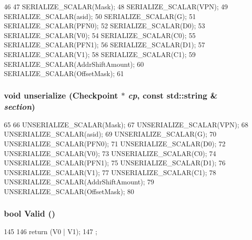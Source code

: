 \begin{DoxyCode}
46 {
47     SERIALIZE_SCALAR(Mask);
48     SERIALIZE_SCALAR(VPN);
49     SERIALIZE_SCALAR(asid);
50     SERIALIZE_SCALAR(G);
51     SERIALIZE_SCALAR(PFN0);
52     SERIALIZE_SCALAR(D0);
53     SERIALIZE_SCALAR(V0);
54     SERIALIZE_SCALAR(C0);
55     SERIALIZE_SCALAR(PFN1);
56     SERIALIZE_SCALAR(D1);
57     SERIALIZE_SCALAR(V1);
58     SERIALIZE_SCALAR(C1);
59     SERIALIZE_SCALAR(AddrShiftAmount);
60     SERIALIZE_SCALAR(OffsetMask);
61 }
\end{DoxyCode}
\hypertarget{structPowerISA_1_1PTE_af22e5d6d660b97db37003ac61ac4ee49}{
\subsubsection[{unserialize}]{\setlength{\rightskip}{0pt plus 5cm}void unserialize ({\bf Checkpoint} $\ast$ {\em cp}, \/  const std::string \& {\em section})}}
\label{structPowerISA_1_1PTE_af22e5d6d660b97db37003ac61ac4ee49}



\begin{DoxyCode}
65 {
66     UNSERIALIZE_SCALAR(Mask);
67     UNSERIALIZE_SCALAR(VPN);
68     UNSERIALIZE_SCALAR(asid);
69     UNSERIALIZE_SCALAR(G);
70     UNSERIALIZE_SCALAR(PFN0);
71     UNSERIALIZE_SCALAR(D0);
72     UNSERIALIZE_SCALAR(V0);
73     UNSERIALIZE_SCALAR(C0);
74     UNSERIALIZE_SCALAR(PFN1);
75     UNSERIALIZE_SCALAR(D1);
76     UNSERIALIZE_SCALAR(V1);
77     UNSERIALIZE_SCALAR(C1);
78     UNSERIALIZE_SCALAR(AddrShiftAmount);
79     UNSERIALIZE_SCALAR(OffsetMask);
80 }
\end{DoxyCode}
\hypertarget{structPowerISA_1_1PTE_a62f0e274c1fe43a9411e2c6d3d144913}{
\subsubsection[{Valid}]{\setlength{\rightskip}{0pt plus 5cm}bool Valid ()}}
\label{structPowerISA_1_1PTE_a62f0e274c1fe43a9411e2c6d3d144913}



\begin{DoxyCode}
145     {
146         return (V0 | V1);
147     };
\end{DoxyCode}


